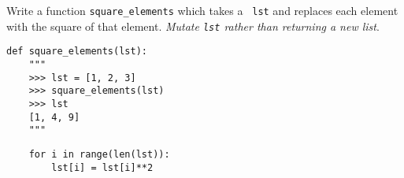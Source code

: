 \begin{blocksection}
\question Write a function {\tt square\_elements} which takes a {\tt
lst} and replaces each element with the square of that element. {\it
Mutate {\tt lst} rather than returning a new list}.

\begin{lstlisting}
def square_elements(lst):
    """
    >>> lst = [1, 2, 3]
    >>> square_elements(lst)
    >>> lst
    [1, 4, 9]
    """
\end{lstlisting}
\begin{solution}[.5in]
\begin{lstlisting}
    for i in range(len(lst)):
        lst[i] = lst[i]**2
\end{lstlisting}
\end{solution}
\end{blocksection}

